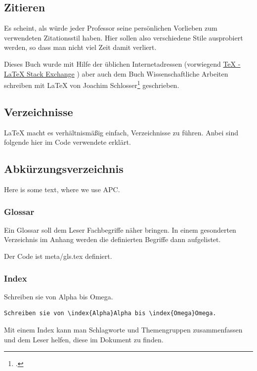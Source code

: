 \subsection{Zitieren}
Es scheint, als würde jeder Professor seine persönlichen Vorlieben zum verwendeten Zitationsstil haben. Hier sollen also verschiedene Stile ausprobiert werden, so dass man nicht viel Zeit damit verliert.

Dieses Buch wurde mit Hilfe der üblichen Internetadressen (vorwiegend \href{https://tex.stackexchange.com/}{TeX - LaTeX Stack Exchange} ) aber auch dem Buch \glqq Wissenschaftliche Arbeiten schreiben mit LaTeX\grqq{} von Joachim Schlosser\footcite{schlosserWissenschaftlicheArbeitenSchreiben2014} geschrieben.
\subsection{Verzeichnisse}
\LaTeX{} macht es verhältnismäßig einfach, Verzeichnisse zu führen. Anbei sind folgende hier im Code verwendete erklärt.
\subsection{Abkürzungsverzeichnis}
Here is some text, where we use APC.
\subsubsection{Glossar}
Ein Glossar soll dem Leser Fachbegriffe näher bringen. In einem gesonderten Verzeichnis im Anhang werden die definierten Begriffe dann aufgelistet.

Der Code ist meta/gls.tex definiert.
\subsubsection{Index}
Schreiben sie von Alpha bis Omega.
\begin{lstlisting}
Schreiben sie von \index{Alpha}Alpha bis \index{Omega}Omega.
\end{lstlisting}

Mit einem Index kann man Schlagworte und Themengruppen zusammenfassen und dem Leser helfen, diese im Dokument zu finden.
